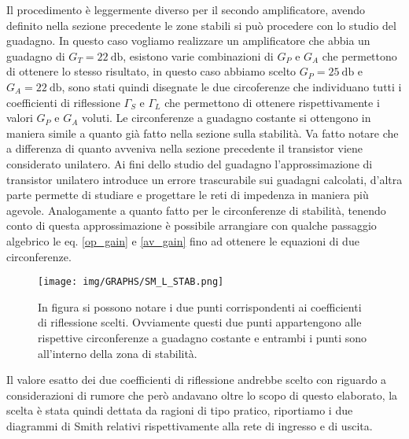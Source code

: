 \documentclass[12pt,oneside]{book}
\begin{document}
Il procedimento è leggermente diverso per il secondo amplificatore, avendo definito nella sezione precedente le zone stabili si può procedere con lo studio del guadagno.
In questo caso vogliamo realizzare un amplificatore che abbia un guadagno di $G_T=\SI{22}{\decibel}$, esistono varie combinazioni di $G_P$ e $G_A$ che permettono di ottenere lo stesso risultato, in questo caso abbiamo scelto $G_P=\SI{25}{\decibel}$ e $G_A=\SI{22}{\decibel}$, sono stati quindi disegnate le due circoferenze che individuano tutti i coefficienti di riflessione $\Gamma_{S}$ e $\Gamma_{L}$ che permettono di ottenere rispettivamente i valori $G_P$ e $G_A$ voluti. Le circonferenze a guadagno costante si ottengono in maniera simile a quanto già fatto nella sezione sulla stabilità. Va fatto notare che a differenza di quanto avveniva nella sezione precedente il transistor viene considerato unilatero. Ai fini dello studio del guadagno l'approssimazione di transistor unilatero introduce un errore trascurabile sui guadagni calcolati, d'altra parte permette di studiare e progettare le reti di impedenza in maniera più agevole. Analogamente a quanto fatto per le circonferenze di stabilità, tenendo conto di questa approssimazione è possibile arrangiare con qualche passaggio algebrico le eq. \ref{op_gain} e \ref{av_gain} fino ad ottenere le equazioni di due circonferenze.

\begin{figure}[!htbp]
    \centering
        \texttt{[image: img/GRAPHS/SM\_L\_STAB.png]}
        \caption{In figura si possono notare i due punti corrispondenti ai coefficienti di riflessione scelti. Ovviamente questi due punti appartengono alle rispettive circonferenze a guadagno costante e entrambi i punti sono all'interno della zona di stabilità.}
\end{figure}

Il valore esatto dei due coefficienti di riflessione andrebbe scelto con riguardo a considerazioni di rumore che però andavano oltre lo scopo di questo elaborato, la scelta è stata quindi dettata da ragioni di tipo pratico, riportiamo i due diagrammi di Smith relativi rispettivamente alla rete di ingresso e di uscita.
\end{document}
